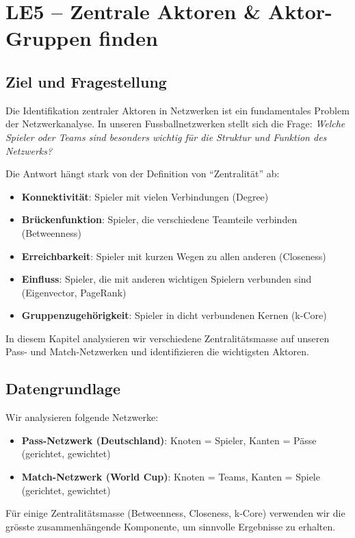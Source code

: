 \section{LE5 -- Zentrale Aktoren \& Aktor-Gruppen finden}

\subsection{Ziel und Fragestellung}

Die Identifikation zentraler Aktoren in Netzwerken ist ein fundamentales Problem der Netzwerkanalyse. In unseren Fussballnetzwerken stellt sich die Frage: \textit{Welche Spieler oder Teams sind besonders wichtig für die Struktur und Funktion des Netzwerks?}

Die Antwort hängt stark von der Definition von \enquote{Zentralität} ab:
\begin{itemize}
  \item \textbf{Konnektivität}: Spieler mit vielen Verbindungen (Degree)
  \item \textbf{Brückenfunktion}: Spieler, die verschiedene Teamteile verbinden (Betweenness)
  \item \textbf{Erreichbarkeit}: Spieler mit kurzen Wegen zu allen anderen (Closeness)
  \item \textbf{Einfluss}: Spieler, die mit anderen wichtigen Spielern verbunden sind (Eigenvector, PageRank)
  \item \textbf{Gruppenzugehörigkeit}: Spieler in dicht verbundenen Kernen (k-Core)
\end{itemize}

In diesem Kapitel analysieren wir verschiedene Zentralitätsmasse auf unseren Pass- und Match-Netzwerken und identifizieren die wichtigsten Aktoren.

\subsection{Datengrundlage}

Wir analysieren folgende Netzwerke:
\begin{itemize}
  \item \textbf{Pass-Netzwerk (Deutschland)}: Knoten = Spieler, Kanten = Pässe (gerichtet, gewichtet)
  \item \textbf{Match-Netzwerk (World Cup)}: Knoten = Teams, Kanten = Spiele (gerichtet, gewichtet)
\end{itemize}

Für einige Zentralitätsmasse (Betweenness, Closeness, k-Core) verwenden wir die grösste zusammenhängende Komponente, um sinnvolle Ergebnisse zu erhalten.

